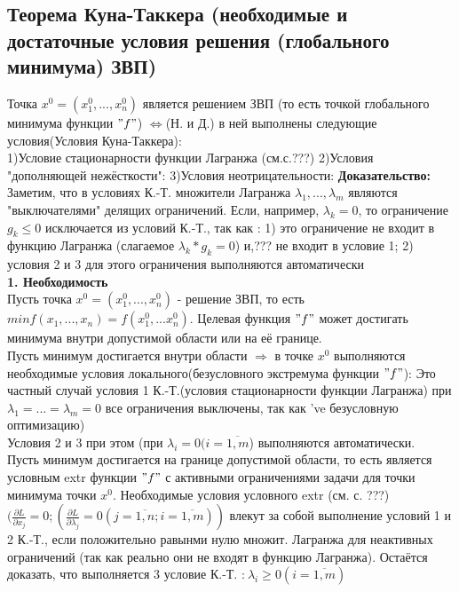 \subsection{Теорема Куна-Таккера (необходимые и достаточные условия решения (глобального минимума) ЗВП)} 
Точка $x^0=(x_1^0,...,x_n^0)$ является решением ЗВП (то есть точкой глобального минимума функции $"f"$) $\Leftrightarrow$(Н. и Д.) в ней выполнены следующие условия(Условия Куна-Таккера):\\
1)Условие стационарности функции Лагранжа (см.с.???)
2)Условия "дополняющей нежёсткости":
3)Условия неотрицательности:
\textbf{Доказательство:}\\
Заметим, что в условиях К.-Т. множители Лагранжа $\lambda_1,..., \lambda_m$ являются "выключателями" делящих ограничений. Если, например, $\lambda_k=0$, то ограничение $g_k \leq 0$ исключается из условий К.-Т., так как : 1) это ограничение не входит в функцию Лагранжа (слагаемое $\lambda_k*g_k = 0$) и,??? не входит в условие 1; 2) условия 2 и 3 для этого ограничения выполняются автоматически\\
\textbf{1. Необходимость}\\
Пусть точка $x^0=(x_1^0,...,x_n^0)$ - решение ЗВП, то есть $minf(x_1,...,x_n)=f(x_1^0,...x_n^0)$. Целевая функция $"f"$ может достигать минимума внутри допустимой области или на её границе.\\
Пусть минимум достигается внутри области $\Rightarrow$ в точке $x^0$ выполняются необходимые условия локального(безусловного экстремума функции $"f"$):
Это частный случай условия 1 К.-Т.(условия стационарности функции Лагранжа) при $\lambda_1=...=\lambda_m = 0$ все ограничения выключены, так как 've безусловную оптимизацию)\\
Условия 2 и 3 при этом (при $\lambda_i = 0 (i=\overline{1,m}$) выполняются автоматически.\\
Пусть минимум достигается на границе допустимой области, то есть является условным extr функции $"f"$ с активными ограничениями задачи для точки минимума точки $x^0$. Необходимые условия условного extr (см. с. ???) $(\frac{\partial L}{\partial x_j}=0;(\frac{\partial L}{\partial \lambda_j}=0 (j=\overline{1,n}; i=\overline{1,m}))$ влекут за собой выполнение условий 1 и 2 К.-Т., если положительно равынми нулю множит. Лагранжа для неактивных ограничений (так как реально они не входят в функцию Лагранжа). Остаётся доказать, что выполняется 3 условие К.-Т. :$\ \lambda_i \geq 0 (i=\overline{1,m})$ \\
